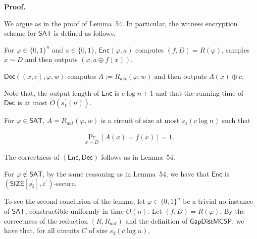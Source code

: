 



\par\medskip\noindent\textbf{Proof.}\par




We argue as in the proof of Lemma 54. In particular, the witness encryption scheme for ${\mathsf{SAT}}$ is defined as follows.\par



For $\varphi\in\{0,1\}^{n}$ and $a\in\{0,1\}$, ${\mathsf{Enc}}(\varphi,a)$ computes $(f,D)=R(\varphi)$, samples $x\sim D$ and then outputs $(x,a\oplus f(x))$.\par




${\mathsf{Dec}}((x,c),\varphi,w)$ computes $A:=R_{wit}(\varphi,w)$ and then outputs $A(x)\oplus c$.\par



Note that, the output length of ${\mathsf{Enc}}$ is $c\log n+1$ and that the running time of ${\mathsf{Dec}}$ is at most $\widetilde{O}(s_{1}^{\prime}(n))$.\par




For $\varphi\in{\mathsf{SAT}}$, $A=R_{wit}(\varphi,w)$ is a circuit of size at most $s_{1}(c\log n)$ such that\par


\[\begin{gathered}
\Pr_{x\sim D}[A(x)=f(x)]=1.
\end{gathered}\]


The correctness of $({\mathsf{Enc}},{\mathsf{Dec}})$ follows as in Lemma 54.\par




For $\varphi\notin{\mathsf{SAT}}$, by the same reasoning as in Lemma 54, we have that ${\mathsf{Enc}}$ is $({\mathsf{SIZE}}[s_{2}^{\prime}],\varepsilon^{\prime})$-secure.\par




To see the second conclusion of the lemma, let $\varphi\in\{0,1\}^{n}$ be a trivial no-instance of ${\mathsf{SAT}}$, constructible uniformly in time $O(n)$. Let $(f,D)=R(\varphi)$. By the correctness of the reduction $(R,R_{wit})$ and the definition of ${\mathsf{GapDistMCSP}}$, we have that, for all circuits $C$ of size $s_{2}(c\log n)$,\par


